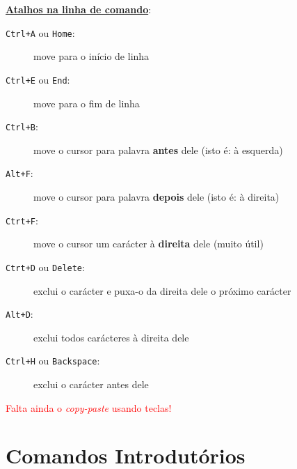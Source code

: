 \documentclass[final,a4paper]{article}
\begin{document}
\underline{\textbf{Atalhos na linha de comando}}:
\begin{description}
\item[\texttt{Ctrl+A} ou \texttt{Home}:] move para o início de linha
\item[\texttt{Ctrl+E} ou \texttt{End}:] move para o fim de linha
\item[\texttt{Ctrl+B}:] move o cursor para palavra \textbf{antes} dele (isto é: à esquerda)
\item[\texttt{Alt+F}:] move o cursor para palavra \textbf{depois} dele
(isto é: à direita)
\item[\texttt{Ctrt+F}:] move o cursor um carácter à \textbf{direita} dele (muito útil)

\item[\texttt{Ctrt+D} ou \texttt{Delete}:] exclui o carácter e puxa-o da direita dele o próximo carácter

\item[\texttt{Alt+D}:] exclui todos carácteres à direita dele

\item[\texttt{Ctrl+H} ou \texttt{Backspace}:] exclui o carácter
antes dele 

\end{description}

\textcolor{red}{Falta ainda o \textit{copy-paste} usando teclas!}



\section{Comandos Introdutórios}
\end{document}

